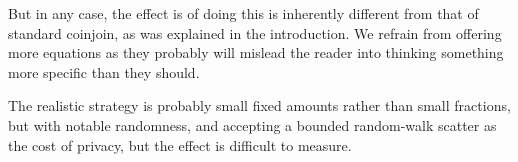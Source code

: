 \documentclass[11pt]{article}
\begin{document}
But in any case, the effect is of doing this is inherently different from that of standard coinjoin, as was explained in the introduction. We refrain from offering more equations as they probably will mislead the reader into thinking something more specific than they should.

The realistic strategy is probably small fixed amounts rather than small fractions, but with notable randomness, and accepting a bounded random-walk scatter as the cost of privacy, but the effect is difficult to measure.
\end{document}
